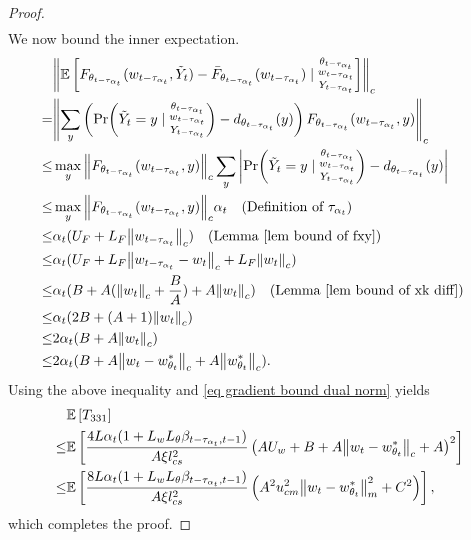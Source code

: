 \documentclass[twoside,11pt]{article}
\newcommand{\E}{\mathbb{E}}
\numberwithin{assucounter}{section}
\begin{document}
\begin{proof}
\begin{align}
  \end{align}
We now bound the inner expectation.
\begin{align}
  &\norm{\E\left[F_{\theta_{t - \tau_{\alpha_t}}}(w_{t- \tau_{\alpha_t}}, \tilde Y_t) - \bar F_{\theta_{t-\tau_{\alpha_t}}}(w_{t- \tau_{\alpha_t}}) \mid \substack{\theta_{t-\tau_{\alpha_t}} \\w_{t-\tau_{\alpha_t}} \\ Y_{t-\tau_{\alpha_t}}}\right]}_c \\
  =&\norm{\sum_y \left(\Pr(\tilde Y_t = y \mid \substack{\theta_{t-\tau_{\alpha_t}} \\w_{t-\tau_{\alpha_t}} \\ Y_{t-\tau_{\alpha_t}}}) - d_{\theta_{t-\tau_{\alpha_t}}}(y) \right) F_{\theta_{t - \tau_{\alpha_t}}}(w_{t- \tau_{\alpha_t}}, y) }_c \\
  \leq &\max_y \norm{ F_{\theta_{t - \tau_{\alpha_t}}}(w_{t- \tau_{\alpha_t}}, y) }_c \sum_y \left|\Pr(\tilde Y_t = y \mid \substack{\theta_{t-\tau_{\alpha_t}} \\w_{t-\tau_{\alpha_t}} \\ Y_{t-\tau_{\alpha_t}}}) - d_{\theta_{t-\tau_{\alpha_t}}}(y) \right| \\
  \label{eq bound of xk-tk}
  \leq &\max_y \norm{ F_{\theta_{t - \tau_{\alpha_t}}}(w_{t- \tau_{\alpha_t}}, y) }_c \alpha_t \qq{(Definition of $\tau_{\alpha_t}$)} \\
  \leq & \alpha_t (U_F + L_F \norm{w_{t-\tau_{\alpha_t}}}_c) \qq{(Lemma \ref{lem bound of fxy})} \\
  \leq & \alpha_t (U_F + L_F \norm{w_{t-\tau_{\alpha_t}} - w_t}_c + L_F \norm{w_t}_c) \\
  \leq & \alpha_t (B + A (\norm{w_t}_c + \frac{B}{A}) + A \norm{w_t}_c) \qq{(Lemma \ref{lem bound of xk diff})} \\
  \leq & \alpha_t (2B + (A + 1) \norm{w_t}_c) \\
  \leq & 2\alpha_t (B + A \norm{w_t}_c) \\
  \leq & 2\alpha_t (B + A \norm{w_t - w^*_{\theta_t}}_c + A \norm{w^*_{\theta_t}}_c).
\end{align}
Using the above inequality and \eqref{eq gradient bound dual norm} yields
\begin{align}
  &\E\left[T_{331}\right] \\
  \leq & \E \left[\frac{4L  \alpha_t(1 + L_wL_\theta \beta_{t-\tau_{\alpha_t}, t-1})}{A\xi l_{cs}^2}\left(AU_w + B + A\norm{w_t - w^*_{\theta_t}}_c + A\right)^2\right] \\
  \leq & \E \left[\frac{8L \alpha_t(1 + L_wL_\theta \beta_{t-\tau_{\alpha_t}, t-1})}{A\xi l_{cs}^2}\left(A^2 u_{cm}^2 \norm{w_t - w^*_{\theta_t}}_m^2 +C^2\right)\right],
\end{align}
which completes the proof.
\end{proof}
\end{document}
